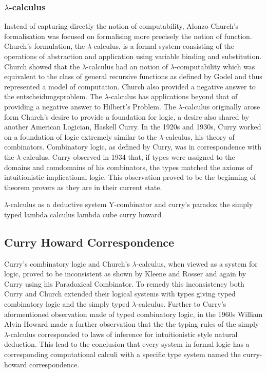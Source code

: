 \subsubsection{$\lambda$-calculus}
Instead of capturing directly the notion of computability, Alonzo Church's
formalisation was focused on formalising more precisely the notion of function.
Church's formulation, the $\lambda$-calculus, is a formal system consisting of
the operations of abstraction and application using variable binding and
substitution. Church showed that the $\lambda$-calculus had an notion of
$\lambda$-computability which was equivalent to the class of general recursive
functions as defined by Godel and thus represented a model of computation.
Church also provided a negative answer to the entscheidungsproblem. The
$\lambda$-calculus has applications beyond that of providing a negative answer
to Hilbert's Problem. The $\lambda$-calculus originally arose form Church's
desire to provide a foundation for logic, a desire also shared by another
American Logician, Haskell Curry. In the 1920s and 1930s, Curry worked on a
foundation of logic extremely similar to the $\lambda$-calculus, his theory of
combinators. Combinatory logic, as defined by Curry, was in correspondence with
the $\lambda$-calculus. Curry observed in 1934 that, if types were assigned to
the domains and comdomains of his combinators, the types  matched the axioms of
intuitionistic implicational logic. This observation proved to be the beginning
of theorem provers as they are in their current state.

$\lambda$-calculus as a deductive system
Y-combinator and curry's paradox
the simply typed lambda calculus
lambda cube
curry howard

\subsection{Curry Howard Correspondence}
Curry's combinatory logic and Church's $\lambda$-calculus, when viewed as a
system for logic, proved to be inconsistent as shown by Kleene and Rosser and
again by Curry using his Paradoxical Combinator. To remedy this inconsistency
both Curry and Church extended their logical systems with types giving typed
combinatory logic and the simply typed $\lambda$-calculus. Further to Curry's
aformentioned observation made of typed combinatory logic, in the 1960s William
Alvin Howard  made a further observation that the the typing rules of the simply
$\lambda$-calculus corresponded to laws of inference for intuitionistic style
natural deduction. This lead to the conclusion that every system in
formal logic has a corresponding computational calculi with a specific type
system named the curry-howard correspondence.

